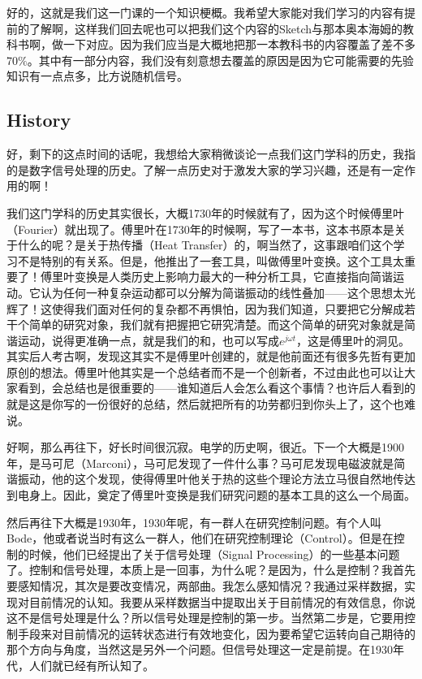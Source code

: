 \documentclass[a4paper,12pt]{article}
\begin{document}
好的，这就是我们这一门课的一个知识梗概。我希望大家能对我们学习的内容有提前的了解啊，这样我们回去呢也可以把我们这个内容的Sketch与那本奥本海姆的教科书啊，做一下对应。因为我们应当是大概地把那一本教科书的内容覆盖了差不多70$\%$。其中有一部分内容，我们没有刻意想去覆盖的原因是因为它可能需要的先验知识有一点点多，比方说随机信号。


\subsection{History}\quad

好，剩下的这点时间的话呢，我想给大家稍微谈论一点我们这门学科的历史，我指的是数字信号处理的历史。了解一点历史对于激发大家的学习兴趣，还是有一定作用的啊！

我们这门学科的历史其实很长，大概1730年的时候就有了，因为这个时候傅里叶（Fourier）就出现了。傅里叶在1730年的时候啊，写了一本书，这本书原本是关于什么的呢？是关于热传播（Heat Transfer）的，啊当然了，这事跟咱们这个学习不是特别的有关系。但是，他推出了一套工具，叫做傅里叶变换。这个工具太重要了！傅里叶变换是人类历史上影响力最大的一种分析工具，它直接指向简谐运动。它认为任何一种复杂运动都可以分解为简谐振动的线性叠加——这个思想太光辉了！这使得我们面对任何的复杂都不再惧怕，因为我们知道，只要把它分解成若干个简单的研究对象，我们就有把握把它研究清楚。而这个简单的研究对象就是简谐运动，说得更准确一点，就是我们的和，也可以写成$e^{j\omega t}$，这是傅里叶的洞见。其实后人考古啊，发现这其实不是傅里叶创建的，就是他前面还有很多先哲有更加原创的想法。傅里叶他其实是一个总结者而不是一个创新者，不过由此也可以让大家看到，会总结也是很重要的——谁知道后人会怎么看这个事情？也许后人看到的就是这是你写的一份很好的总结，然后就把所有的功劳都归到你头上了，这个也难说。


好啊，那么再往下，好长时间很沉寂。电学的历史啊，很近。下一个大概是1900年，是马可尼（Marconi），马可尼发现了一件什么事？马可尼发现电磁波就是简谐振动，他的这个发现，使得傅里叶他关于热的这些个理论方法立马很自然地传达到电身上。因此，奠定了傅里叶变换是我们研究问题的基本工具的这么一个局面。


然后再往下大概是1930年，1930年呢，有一群人在研究控制问题。有个人叫Bode，他或者说当时有这么一群人，他们在研究控制理论（Control）。但是在控制的时候，他们已经提出了关于信号处理（Signal Processing）的一些基本问题了。控制和信号处理，本质上是一回事，为什么呢？是因为，什么是控制？我首先要感知情况，其次是要改变情况，两部曲。我怎么感知情况？我通过采样数据，实现对目前情况的认知。我要从采样数据当中提取出关于目前情况的有效信息，你说这不是信号处理是什么？所以信号处理是控制的第一步。当然第二步是，它要用控制手段来对目前情况的运转状态进行有效地变化，因为要希望它运转向自己期待的那个方向与角度，当然这是另外一个问题。但信号处理这一定是前提。在1930年代，人们就已经有所认知了。
\end{document}
